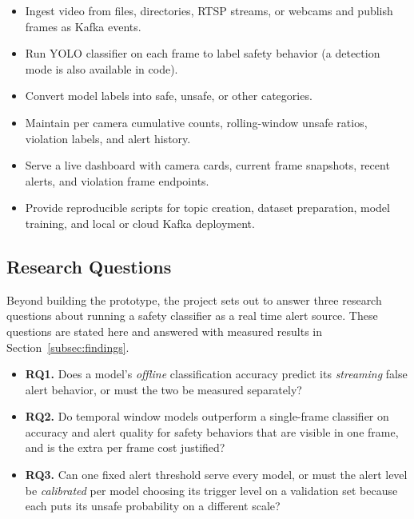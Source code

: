 \documentclass[conference]{IEEEtran}
\begin{document}
\begin{itemize}
\item Ingest video from files, directories, RTSP streams, or webcams and publish frames as Kafka events.
\item Run YOLO classifier on each frame to label safety behavior (a detection mode is also available in code).
\item Convert model labels into safe, unsafe, or other categories.
\item Maintain per camera cumulative counts, rolling-window unsafe ratios, violation labels, and alert history.
\item Serve a live dashboard with camera cards, current frame snapshots, recent alerts, and violation frame endpoints.
\item Provide reproducible scripts for topic creation, dataset preparation, model training, and local or cloud Kafka deployment.
\end{itemize}

\subsection{Research Questions}
\label{subsec:research-questions}

Beyond building the prototype, the project sets out to answer three
research questions about running a safety classifier as a real time alert
source. These questions are stated here and answered with measured results
in Section~\ref{subsec:findings}.

\begin{itemize}
\item \textbf{RQ1.} Does a model's \emph{offline} classification accuracy
predict its \emph{streaming} false alert behavior, or must the two be
measured separately?

\item \textbf{RQ2.} Do temporal window models outperform a single-frame
classifier on accuracy and alert quality for safety behaviors that are
visible in one frame, and is the extra per frame cost justified?

\item \textbf{RQ3.} Can one fixed alert threshold serve every model, or
must the alert level be \emph{calibrated} per model choosing its trigger
level on a validation set because each puts its unsafe probability on a
different scale?
\end{itemize}

\end{document}
